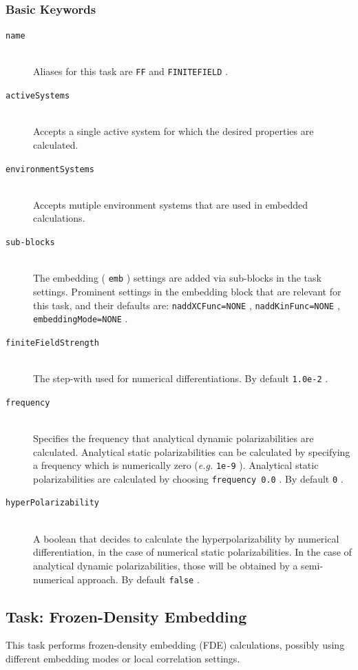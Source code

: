 \documentclass[bibliography=totocnumbered,a4paper,10pt,oneside]{scrbook}
\newcommand{\ttt}[1]{%
  \begingroup\setlength{\fboxsep}{1pt}%
  \colorbox{serenity-green!30}{\texttt{\hspace*{2pt}\vphantom{(g}#1\hspace*{2pt}}}%
  \endgroup
}
\begin{document}
\subsubsection{Basic Keywords}
\begin{description}
	\item [\texttt{name}]\hfill \\
	Aliases for this task are \ttt{FF} and \ttt{FINITEFIELD}.
	\item [\texttt{activeSystems}]\hfill \\
	Accepts a single active system for which the desired properties are calculated.
	\item [\texttt{environmentSystems}]\hfill \\
	Accepts mutiple environment systems that are used in embedded calculations.
	\item [\texttt{sub-blocks}]\hfill \\
	The embedding (\ttt{emb}) settings are added via sub-blocks in the task settings.
	Prominent settings in the embedding block that are relevant for this task, and their defaults are:
	\ttt{naddXCFunc=NONE}, \ttt{naddKinFunc=NONE}, \ttt{embeddingMode=NONE}.
    \item [\texttt{finiteFieldStrength}]\hfill \\
    The step-with used for numerical differentiations. By default \ttt{1.0e-2}.
    \item [\texttt{frequency}]\hfill \\
    Specifies the frequency that analytical dynamic polarizabilities are calculated. Analytical static polarizabilities
    can be calculated by specifying a frequency which is numerically zero (\emph{e.g.} \ttt{1e-9}). Analytical static polarizabilities
    are calculated by choosing \ttt{frequency 0.0}. By default \ttt{0}.
    \item [\texttt{hyperPolarizability}]\hfill \\
    A boolean that decides to calculate the hyperpolarizability by numerical differentiation, in the case of numerical static polarizabilities. In the case of analytical dynamic polarizabilities, those will be obtained by a semi-numerical approach. By default \ttt{false}.
\end{description}


\subsection{Task: Frozen-Density Embedding}
\label{sec:FDE}
This task performs frozen-density embedding (FDE) calculations, possibly using different embedding modes or local correlation settings.
\end{document}
